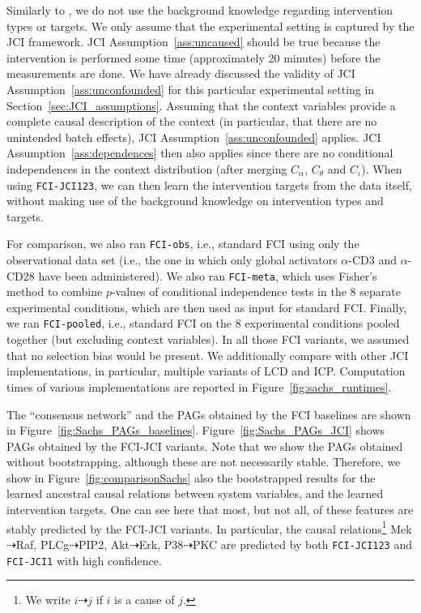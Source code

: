 \documentclass[twoside,11pt]{article}
\newcommand\idcausal{\dashrightarrow}
\newcommand\causes{\idcausal}
\newcommand{\alg}[1]{\texttt{#1}}
\newcommand{\Joris}[1]{{\color{blue}#1}}
\begin{document}
Similarly to \citet{EatonMurphy07}, we do not use the background knowledge regarding intervention types or targets. 
We only assume that the experimental setting is captured by the JCI framework.
JCI Assumption~\ref{ass:uncaused} should be true because the intervention is performed some time (approximately 20 minutes) before the measurements are done.
We have already discussed the validity of JCI Assumption~\ref{ass:unconfounded} for this particular experimental setting in Section~\ref{sec:JCI_assumptions}. Assuming that the context variables provide a complete causal description of the context (in particular, that there are no unintended batch effects), JCI Assumption~\ref{ass:unconfounded} applies.
JCI Assumption~\ref{ass:dependences} then also applies since there are no conditional independences in the context distribution (after merging $C_\alpha$, $C_\theta$ and $C_\iota$). 
When using \alg{FCI-JCI123}, we can then learn the intervention targets from the data itself, without making use of the background knowledge on intervention types and targets. 

For comparison, we also ran \alg{FCI-obs}, i.e., standard FCI using only the observational data set
(i.e., the one in which only global activators $\alpha$-CD3 and $\alpha$-CD28 have been administered). 
We also ran \alg{FCI-meta}, which uses Fisher's method to combine $p$-values of conditional independence tests in the 8 separate experimental conditions, which are then used as input for standard FCI. Finally, we ran \alg{FCI-pooled}, i.e., standard FCI on the 8 experimental conditions pooled together (but excluding context variables). In all those FCI variants, we assumed that no selection bias would be present.
We additionally compare with other JCI implementations, in particular, multiple variants of LCD and ICP.
Computation times of various implementations are reported in Figure~\ref{fig:sachs_runtimes}.

The ``consensus network'' and the PAGs obtained by the FCI baselines are shown in Figure~\ref{fig:Sachs_PAGs_baselines}. 
Figure~\ref{fig:Sachs_PAGs_JCI} shows PAGs obtained by the FCI-JCI variants. Note that we show the PAGs obtained without bootstrapping, although these are not necessarily stable. Therefore, we show in Figure~\ref{fig:comparisonSachs} also the bootstrapped results for the learned ancestral causal relations between system variables, and the learned intervention targets. One can see here that most, but not all, of these features are stably predicted by the FCI-JCI variants. In particular, the causal relations\footnote{We write $i \causes j$ if $i$ is a cause of $j$.} Mek$\causes$Raf, PLCg$\causes$PIP2, Akt$\causes$Erk, P38$\causes$PKC are predicted by both \alg{FCI-JCI123} and \alg{FCI-JCI1} with high confidence.
\end{document}
